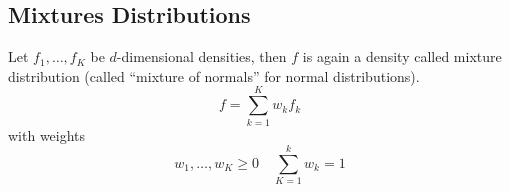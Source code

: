 \subsection{Mixtures Distributions}
Let $f_1,\dots, f_K$ be $d$-dimensional densities, then $f$ is again a density called mixture distribution (called ``mixture of normals'' for normal distributions).
\begin{equation*}
    f = \sum_{k=1}^{K} w_k f_k
\end{equation*}
with weights
\begin{equation*}
    w_1, \ldots, w_K \geq 0 \quad \sum_{K=1}^{k}w_k = 1
\end{equation*}
